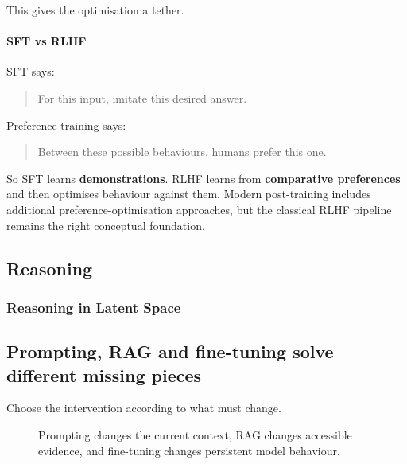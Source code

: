 This gives the optimisation a tether.

\paragraph*{SFT vs RLHF}
SFT says:
\begin{quote}
For this input, imitate this desired answer.
\end{quote}

Preference training says:
\begin{quote}
Between these possible behaviours, humans prefer this one.
\end{quote}

So SFT learns \textbf{demonstrations}.
RLHF learns from \textbf{comparative preferences} and then optimises behaviour against them.
Modern post-training includes additional preference-optimisation approaches, but the classical RLHF pipeline remains the right conceptual foundation.


\subsection{Reasoning}
\subsubsection{Reasoning in Latent Space}


\subsection{Prompting, RAG and fine-tuning solve different missing pieces}
\label{sec:llms-prompt-rag-ft}
Choose the intervention according to what must change.

\begin{figure}[htbp]
\centering
{}
\caption{Prompting changes the current context, RAG changes accessible evidence, and fine-tuning changes persistent model behaviour.}
\end{figure}

